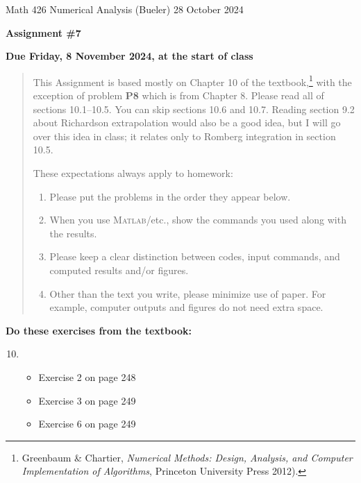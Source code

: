 \documentclass[12pt]{amsart}
\newcommand{\Matlab}{\textsc{Matlab}\xspace}
\begin{document}
\scriptsize \noindent Math 426 Numerical Analysis (Bueler) \hfill 28 October 2024
\normalsize

\medskip\bigskip

\Large\centerline{\textbf{Assignment \#7}}
\large
\bigskip

\centerline{\textbf{Due Friday, 8 November 2024, at the start of class}}
\medskip
\normalsize

\thispagestyle{empty}

\begin{quote}
{\small
This Assignment is based mostly on Chapter 10 of the textbook,\footnote{Greenbaum \& Chartier, \emph{Numerical Methods: Design, Analysis, and Computer Implementation of Algorithms}, Princeton University Press 2012).} with the exception of problem \textbf{P8} which is from Chapter 8.  Please read all of sections 10.1--10.5.  You can skip sections 10.6 and 10.7.  Reading section 9.2 about Richardson extrapolation would also be a good idea, but I will go over this idea in class; it relates only to Romberg integration in section 10.5.

\medskip
\noindent These expectations always apply to homework:
\renewcommand{\labelenumi}{\arabic{enumi}.\,}
\begin{enumerate}
\item Please put the problems in the order they appear below.
\item When you use \Matlab/etc., show the commands you used along with the results.
\item Please keep a clear distinction between codes, input commands, and computed results and/or figures.
\item Other than the text you write, please minimize use of paper.  For example, computer outputs and figures do not need extra space.
\end{enumerate}
}
\end{quote}

\bigskip
\noindent \textbf{Do these exercises from the textbook:}

\smallskip
\renewcommand{\labelenumi}{{\footnotesize\underline{\textsc{Chapter \arabic{enumi}}}}}
\begin{enumerate}
\setcounter{enumi}{9}
\item ~
    \begin{itemize}
    \item Exercise 2 on page 248
    \item Exercise 3 on page 249
    \item Exercise 6 on page 249
    \end{itemize}
\end{enumerate}
\end{document}
